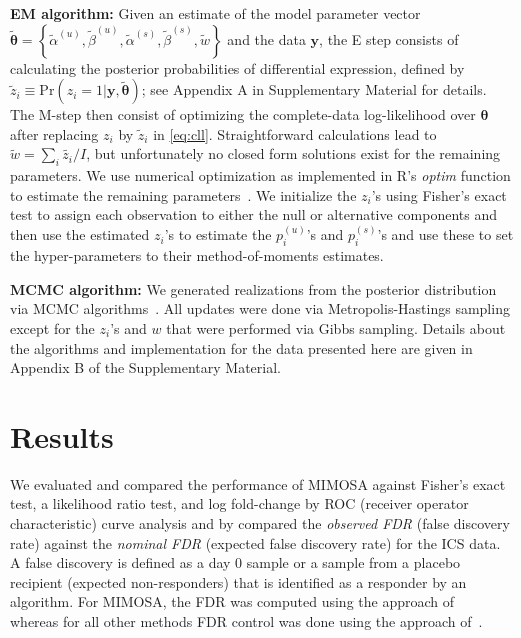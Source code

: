 \documentclass[12pt,oupdraft]{biostatistics}
\begin{document}
\noindent\textbf{EM algorithm:} Given an estimate of the model parameter vector $\tilde{\boldsymbol{\theta}}=\left\{\tilde{\alpha}^{(u)},\tilde{\beta}^{(u)},\tilde{\alpha}^{(s)},\tilde{\beta}^{(s)},\tilde{w}\right\}$ and the data $\mathbf{y}$, the E step consists of calculating the posterior probabilities of differential expression, defined by
$\tilde z_{i} \equiv \mathrm{Pr}(z_i=1|\mathbf{y},\tilde{\boldsymbol{\theta}})$; see Appendix A in Supplementary Material for details.
The M-step then consist of optimizing the complete-data log-likelihood over $\boldsymbol{\theta}$ after replacing $z_i$ by $\tilde{z}_{i}$ in \eqref{eq:cll}. Straightforward calculations lead to
$\tilde w = \sum_i{\tilde{z_i}}/I$, but unfortunately no closed form solutions exist for the remaining parameters. We use numerical optimization as implemented in R's \textit{optim} function to estimate the remaining parameters~\citep{Ihaka:1996ud}.  We initialize the $z_{i}$'s using Fisher's exact test to assign each observation to either the null or alternative components and then use the estimated $z_i$'s to estimate the $p^{(u)}_{i}$'s and $p^{(s)}_{i}$'s and use these to set the hyper-parameters to their method-of-moments estimates.

\noindent\textbf{MCMC algorithm:} We generated realizations from the posterior distribution via MCMC algorithms~\citep{Walter1996}. All updates were done via Metropolis-Hastings sampling except for the $z_i$'s and $w$ that were performed via Gibbs sampling.
Details about the algorithms and implementation for the data presented here are given in Appendix B of the Supplementary Material. 

\section{Results}
\label{s:results}
We evaluated and compared the performance of MIMOSA against Fisher's exact test, a likelihood ratio test, and log fold-change by ROC (receiver operator characteristic) curve analysis and by compared the \textit{observed FDR} (false discovery rate) against the \textit{nominal FDR} (expected false discovery rate) for the ICS data.  A false discovery is defined as a day 0 sample or a sample from a placebo recipient (expected non-responders) that is identified as a responder by an algorithm. For MIMOSA, the FDR was computed using the approach of~\citet{Newton2004} whereas for all other methods FDR control was done using the approach of~\citet{Benjamini1995}.
\end{document}
